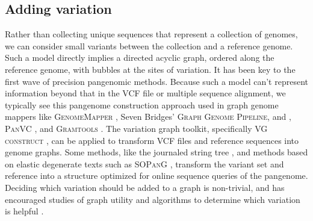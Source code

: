 
\subsection{Adding variation}

Rather than collecting unique sequences that represent a collection of genomes, we can consider small variants between the collection and a reference genome.
Such a model directly implies a directed acyclic graph, ordered along the reference genome, with bubbles at the sites of variation.
It has been key to the first wave of precision pangenomic methods.
Because such a model can't represent information beyond that in the VCF file or multiple sequence alignment, we typically see this pangenome construction approach used in graph genome mappers like \textsc{GenomeMapper} \cite{Schneeberger_2009}, Seven Bridges' \textsc{Graph Genome Pipeline}, and \cite{Rakocevic_2019}, \textsc{PanVC} \cite{Valenzuela_2018}, and \textsc{Gramtools} \cite{Maciuca_2016}.
The variation graph toolkit, specifically \textsc{VG construct} \cite{Garrison_2018}, can be applied to transform VCF files and reference sequences into genome graphs.
Some methods, like the journaled string tree \cite{Rahn_2014}, and methods based on elastic degenerate texts \cite{Bernardini_2019} such as \textsc{SOPanG} \cite{Cis_ak_2018}, transform the variant set and reference into a structure optimized for online sequence queries of the pangenome.
Deciding which variation should be added to a graph is non-trivial, and has encouraged studies of graph utility \cite{Novak_2017a} and algorithms to determine which variation is helpful \cite{Pritt_2018}.





